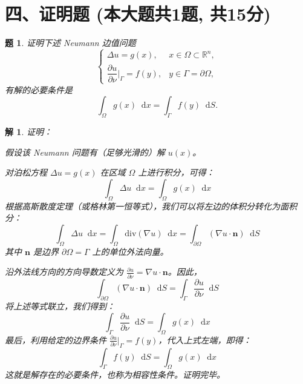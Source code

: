 \documentclass[12pt,a4paper]{article}
\newcommand{\diff}{\mathop{}\!\mathrm{d}}  %
\newcommand{\R}{\mathbb{R}}                %
\newtheorem{problem}{题}
\newtheorem*{solution}{解}
\begin{document}
	\section*{四、证明题 (本大题共1题, 共15分)}
	
	\begin{problem}
		证明下述 Neumann 边值问题
		\[
		\begin{cases}
			\Delta u = g(x), & x \in \Omega \subset \R^n, \\
			\dfrac{\partial u}{\partial \nu} \Big|_{\Gamma} = f(y), & y \in \Gamma = \partial\Omega,
		\end{cases}
		\]
		有解的必要条件是
		\[ \int_{\Omega} g(x) \diff x = \int_{\Gamma} f(y) \diff S. \]
	\end{problem}
	\hrulefill
	\begin{solution}
		证明：
		
		\noindent
		假设该 Neumann 问题有（足够光滑的）解 $u(x)$。
		
		\noindent
		对泊松方程 $\Delta u = g(x)$ 在区域 $\Omega$ 上进行积分，可得：
		\[
		\int_{\Omega} \Delta u \diff x = \int_{\Omega} g(x) \diff x
		\]
		根据高斯散度定理（或格林第一恒等式），我们可以将左边的体积分转化为面积分：
		\[
		\int_{\Omega} \Delta u \diff x = \int_{\Omega} \mathrm{div}(\nabla u) \diff x = \int_{\partial \Omega} (\nabla u \cdot \mathbf{n}) \diff S
		\]
		其中 $\mathbf{n}$ 是边界 $\partial\Omega = \Gamma$ 上的单位外法向量。
		
		\noindent
		沿外法线方向的方向导数定义为 $\frac{\partial u}{\partial \nu} = \nabla u \cdot \mathbf{n}$。因此，
		\[
		\int_{\partial \Omega} (\nabla u \cdot \mathbf{n}) \diff S = \int_{\Gamma} \frac{\partial u}{\partial \nu} \diff S
		\]
		将上述等式联立，我们得到：
		\[
		\int_{\Gamma} \frac{\partial u}{\partial \nu} \diff S = \int_{\Omega} g(x) \diff x
		\]
		最后，利用给定的边界条件 $\frac{\partial u}{\partial \nu} \Big|_{\Gamma} = f(y)$，代入上式左端，即得：
		\[
		\int_{\Gamma} f(y) \diff S = \int_{\Omega} g(x) \diff x
		\]
		这就是解存在的必要条件，也称为相容性条件。证明完毕。
		
	\end{solution}
	
\end{document}
